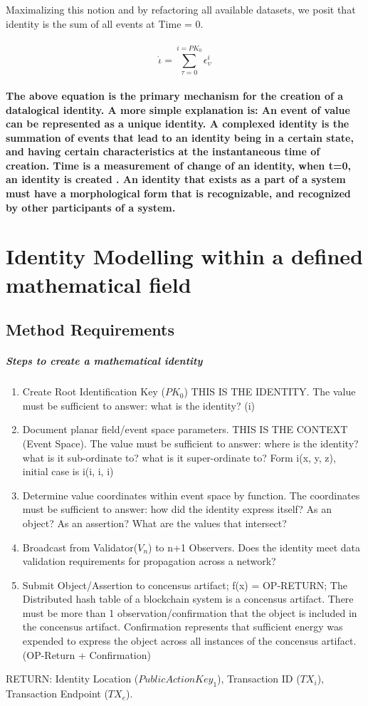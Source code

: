 \documentclass{article}
\begin{document}
Maximalizing this notion and by refactoring all available datasets, we posit that identity is the sum of all events at Time = 0.\\
\\
	\begin{equation}
		\dot \iota = \sum_{\tau=0}^{i=PK_0} \epsilon^i_\upsilon
	\end{equation}
 		
\paragraph{The above equation is the primary mechanism for the creation of a datalogical identity.  A more simple explanation is:  An event of value can be represented as a unique identity.  A complexed identity is the summation of events that lead to an identity being in a certain state, and having certain characteristics at the instantaneous time of creation.  Time is a measurement of change of an identity, when t=0, an identity is created .  An identity that exists as a part of a system must have a morphological form that is recognizable, and recognized by other participants of a system.}

\section{Identity Modelling within a defined mathematical field}
	\subsection{Method Requirements}
			\subparagraph{Steps to create a mathematical identity}
			\begin{enumerate}
				\item Create Root Identification Key ($PK_0$)  THIS IS THE IDENTITY.  The value must be sufficient to answer: what is the identity? (i)
				\item Document planar field/event space parameters.  THIS IS THE CONTEXT (Event Space).  The value must be sufficient to answer: where is the identity? what is it sub-ordinate to? what is it super-ordinate to? Form i(x, y, z), initial case is i(i, i, i)
				\item Determine value coordinates within event space by function. The coordinates must be sufficient to answer: how did the identity express itself?  As an object? As an assertion? What are the values that intersect?
				\item Broadcast from Validator($V_n$) to n+1 Observers.  Does the identity meet data validation requirements for propagation across a network?
				\item Submit Object/Assertion to concensus artifact;  f(x) = OP-RETURN;  The Distributed hash table of a blockchain system is a concensus artifact.  There must be more than 1 observation/confirmation that the object is included in the concensus artifact. Confirmation represents that sufficient energy was expended to express the object across all instances of the concensus artifact. (OP-Return + Confirmation)  
			\end{enumerate}			
			RETURN:  Identity Location ($PublicActionKey_1$),  Transaction ID ($TX_i$), Transaction Endpoint ($TX_e$).
			
\end{document}
